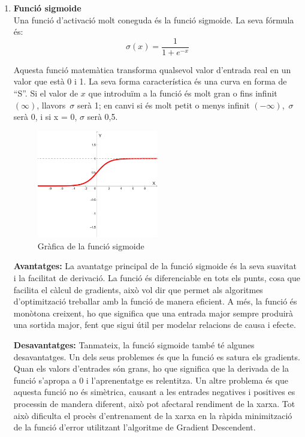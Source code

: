 \begin{enumerate}
 \item \label{sigmoide}{\textbf{Funció sigmoide}}\\
 Una funció d'activació molt coneguda és la funció sigmoide. La seva fórmula és:
\[ \sigma(x) = \frac{1}{1 + e^{-x}} \]

Aquesta funció matemàtica transforma qualsevol valor d'entrada real en un valor que està 0 i 1. La seva forma característica és una curva en forma de ``S''. Si el valor de $x$ que introduïm a la funció és molt gran o fins infinit $(\infty)$, llavors\ $\sigma$ serà 1; en canvi si és molt petit o menys infinit $(-\infty)$,\ $\sigma$ serà 0, i si x = 0,  $\sigma$  serà 0,5.

\begin{figure}[h!]
    \centering
    \includegraphics[width=0.5\textwidth]{./figures/grafica_sigmoide.png}
    \caption{Gràfica de la funció sigmoide}
\end{figure}

\textbf{Avantatges:}
La avantatge principal de la funció sigmoide és la seva suavitat i la facilitat de derivació. La funció és diferenciable en tots els punts, cosa que facilita el càlcul de gradients, això vol dir que permet als algoritmes d'optimització treballar amb la funció de manera eficient. A més, la funció és monòtona creixent, ho que significa que una entrada major sempre produirà una sortida major, fent que sigui útil per modelar relacions de causa i efecte.

\textbf{Desavantatges:}
Tanmateix, la funció sigmoide també té algunes desavantatges. Un dels seus problemes és que la funció es satura els gradients. Quan els valors d'entrades són grans, ho que significa que la derivada de la funció s'apropa a 0 i l'aprenentatge es relentitza. Un altre problema és que aquesta funció no és simètrica, causant a les entrades negatives i positives es processin de mandera diferent, això pot afectaral rendiment de la xarxa. Tot això dificulta el procès d'entrenament de la xarxa en la ràpida minimització de la funció d'error utilitzant l'algoritme de Gradient Descendent.


\end{enumerate}
